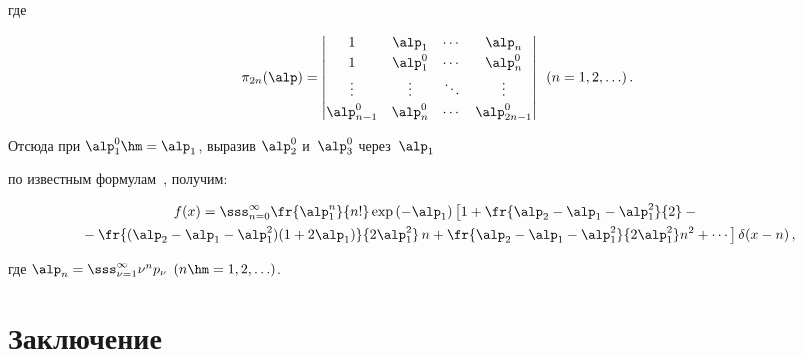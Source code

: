 где



\noindent

\begin{equation*}

\pi_{2n} (\alp) = \begin{vmatrix}

    1&\alp_1&\cdots&\alp_n\\[2pt]

    1&\alp_1^0&\cdots&\alp_{n}^0\\[2pt]

    \vdots&\vdots&\ddots&\vdots\\[2pt]

    \alp_{n-1}^0&\alp_{n}^0&\cdots&\alp_{2n-1}^0\end{vmatrix}

     \enskip (n=1,2,\ldots)\,.


     \end{equation*}

Отсюда при  $\alp_1^0 \hm= \alp_1$, выразив $\alp_2^0$ и~$\alp_3^0$ через~$\alp_1$ 

по известным формулам~\cite{2-s2}, получим:



\noindent

\begin{multline*}

f(x) = \sss_{n=0}^\infty \fr{\alp_1^n}{n!} \exp\left(-\alp_1\right) 

\left[ 1 + \fr{\alp_2 - \alp_1 - \alp_1^2}{2} -{}\right.\\

\left.{}- 

\fr{(\alp_2 - \alp_1 - \alp_1^2) (1+ 2 \alp_1)}{2 \alp_1^2} \,n +

\fr{\alp_2 - \alp_1 - \alp_1^2}{2 \alp_1^2} n^2 + \cdots \right] 

\delta (x-n)\,,


\end{multline*}

где $\alp_n = \sss_{\nu=1}^\infty \nu^n p_\nu$ $(n\hm=1,2,\ldots)$.



\section{Заключение}



